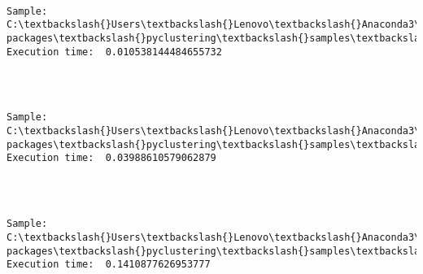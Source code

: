 \documentclass[11pt]{article}
\begin{document}
    \begin{center}
    \end{center}
    { \hspace*{\fill} \\}
    
    \begin{Verbatim}[commandchars=\\\{\}]
Sample:  C:\textbackslash{}Users\textbackslash{}Lenovo\textbackslash{}Anaconda3\textbackslash{}lib\textbackslash{}site-packages\textbackslash{}pyclustering\textbackslash{}samples\textbackslash{}samples\textbackslash{}simple\textbackslash{}Elongate.data 		Execution time:  0.010538144484655732 


    \end{Verbatim}

    \begin{center}
    \end{center}
    { \hspace*{\fill} \\}
    
    \begin{Verbatim}[commandchars=\\\{\}]
Sample:  C:\textbackslash{}Users\textbackslash{}Lenovo\textbackslash{}Anaconda3\textbackslash{}lib\textbackslash{}site-packages\textbackslash{}pyclustering\textbackslash{}samples\textbackslash{}samples\textbackslash{}fcps\textbackslash{}Lsun.data 		Execution time:  0.03988610579062879 


    \end{Verbatim}

    \begin{center}
    \end{center}
    { \hspace*{\fill} \\}
    
    \begin{Verbatim}[commandchars=\\\{\}]
Sample:  C:\textbackslash{}Users\textbackslash{}Lenovo\textbackslash{}Anaconda3\textbackslash{}lib\textbackslash{}site-packages\textbackslash{}pyclustering\textbackslash{}samples\textbackslash{}samples\textbackslash{}fcps\textbackslash{}Target.data 		Execution time:  0.1410877626953777 


    \end{Verbatim}
\end{document}
